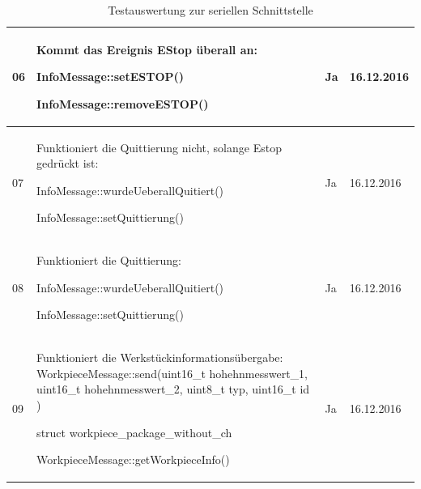\documentclass[a4paper, 11pt]{article}
\begin{document}
\begin{table}[H]
\begin{tabularx}{\textwidth}{|l|X|l|l|}
        06&Kommt das Ereignis EStop überall an:
        \begin{compactenum}[]
            \item \ttfamily InfoMessage::setESTOP()
            \item \ttfamily InfoMessage::removeESTOP()
        \end{compactenum}
        &Ja&16.12.2016\\
        \hline
        
        07&Funktioniert die Quittierung nicht, solange Estop gedrückt ist:
        \begin{compactenum}[]
            \item \ttfamily InfoMessage::wurdeUeberallQuitiert()
            \item \ttfamily InfoMessage::setQuittierung()
        \end{compactenum}
        &Ja&16.12.2016\\
        \hline
        
        08&Funktioniert die Quittierung:
        \begin{compactenum}[]
            \item \ttfamily InfoMessage::wurdeUeberallQuitiert()
            \item \ttfamily InfoMessage::setQuittierung()
        \end{compactenum}
        &Ja&16.12.2016\\
        \hline
        
        09&Funktioniert die Werkstückinformationsübergabe:
        {\ttfamily WorkpieceMessage::send(uint16\_t hohehnmesswert\_1, uint16\_t hohehnmesswert\_2, uint8\_t typ, uint16\_t id )}
        \begin{compactenum}[]
            \item \ttfamily struct workpiece\_package\_without\_ch 
            \item \ttfamily WorkpieceMessage::getWorkpieceInfo()
        \end{compactenum}
        &Ja&16.12.2016\\
        \hline
    \end{tabularx}
    \caption{Testauswertung zur seriellen Schnittstelle}
    \label{tstserintf}
\end{table}

\newpage
\end{document}
